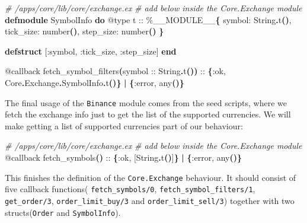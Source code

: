 \documentclass[
  oneside]{book}
\newenvironment{Shaded}{\begin{snugshade}}{\end{snugshade}}
\newcommand{\CommentTok}[1]{\textcolor[rgb]{0.56,0.35,0.01}{\textit{#1}}}
\newcommand{\ConstantTok}[1]{\textcolor[rgb]{0.56,0.35,0.01}{#1}}
\newcommand{\FunctionTok}[1]{\textcolor[rgb]{0.13,0.29,0.53}{\textbf{#1}}}
\newcommand{\KeywordTok}[1]{\textcolor[rgb]{0.13,0.29,0.53}{\textbf{#1}}}
\newcommand{\NormalTok}[1]{#1}
\newcommand{\OperatorTok}[1]{\textcolor[rgb]{0.81,0.36,0.00}{\textbf{#1}}}
\newcommand{\OtherTok}[1]{\textcolor[rgb]{0.56,0.35,0.01}{#1}}
\newcommand{\VariableTok}[1]{\textcolor[rgb]{0.00,0.00,0.00}{#1}}
\begin{document}
\begin{Shaded}
\begin{Highlighting}[]
  \CommentTok{\# /apps/core/lib/core/exchange.ex}
  \CommentTok{\# add below inside the Core.Exchange module}
  \KeywordTok{defmodule} \ConstantTok{SymbolInfo} \KeywordTok{do}
    \OtherTok{@type}\NormalTok{ t :: \%}\ConstantTok{\_\_MODULE\_\_}\FunctionTok{\{}
            \VariableTok{symbol:} \ConstantTok{String}\OperatorTok{.}\NormalTok{t}\FunctionTok{()}\NormalTok{,}
            \VariableTok{tick\_size:}\NormalTok{ number}\FunctionTok{()}\NormalTok{,}
            \VariableTok{step\_size:}\NormalTok{ number}\FunctionTok{()}
          \FunctionTok{\}}

    \KeywordTok{defstruct} \OtherTok{[}\VariableTok{:symbol}\NormalTok{, }\VariableTok{:tick\_size}\NormalTok{, }\VariableTok{:step\_size}\OtherTok{]}
  \KeywordTok{end}

  \OtherTok{@callback}\NormalTok{ fetch\_symbol\_filters}\FunctionTok{(}\NormalTok{symbol :: }\ConstantTok{String}\OperatorTok{.}\NormalTok{t}\FunctionTok{())}\NormalTok{ ::}
              \FunctionTok{\{}\VariableTok{:ok}\NormalTok{, }\ConstantTok{Core}\OperatorTok{.}\ConstantTok{Exchange}\OperatorTok{.}\ConstantTok{SymbolInfo}\OperatorTok{.}\NormalTok{t}\FunctionTok{()\}}
              \OperatorTok{|} \FunctionTok{\{}\VariableTok{:error}\NormalTok{, any}\FunctionTok{()\}}
\end{Highlighting}
\end{Shaded}

The final usage of the \texttt{Binance} module comes from the seed scripts, where we fetch the exchange info just to get the list of the supported currencies. We will make getting a list of supported currencies part of our behaviour:

\begin{Shaded}
\begin{Highlighting}[]
  \CommentTok{\# /apps/core/lib/core/exchange.ex}
  \CommentTok{\# add below inside the Core.Exchange module}
  \OtherTok{@callback}\NormalTok{ fetch\_symbols}\FunctionTok{()}\NormalTok{ ::}
              \FunctionTok{\{}\VariableTok{:ok}\NormalTok{, }\OtherTok{[}\ConstantTok{String}\OperatorTok{.}\NormalTok{t}\FunctionTok{()}\OtherTok{]}\FunctionTok{\}}
              \OperatorTok{|} \FunctionTok{\{}\VariableTok{:error}\NormalTok{, any}\FunctionTok{()\}}
\end{Highlighting}
\end{Shaded}

This finishes the definition of the \texttt{Core.Exchange} behaviour. It should consist of five callback functions(
\texttt{fetch\_symbols/0}, \texttt{fetch\_symbol\_filters/1}, \texttt{get\_order/3}, \texttt{order\_limit\_buy/3} and \texttt{order\_limit\_sell/3}) together with two structs(\texttt{Order} and \texttt{SymbolInfo}).
\end{document}
